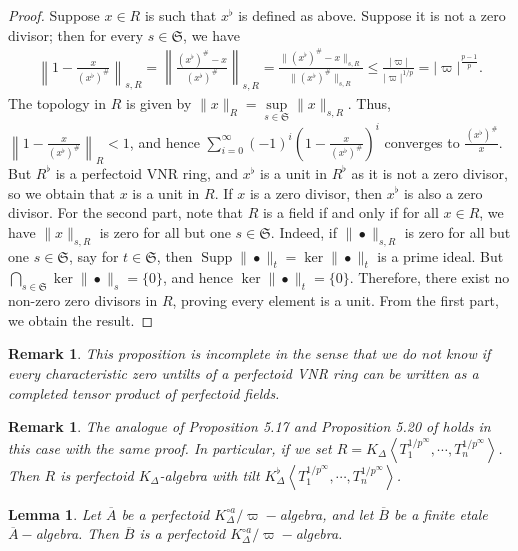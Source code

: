 \documentclass[12pts,a4paper]{amsart}
\newtheorem{lemma}[proposition]{Lemma}
\newtheorem{remark}[proposition]{Remark}
\DeclareMathOperator{\Supp}{Supp}
\begin{document}
\begin{proof}
Suppose $x\in R$ is such that $x^\flat$ is defined as above. Suppose it is not a zero divisor; then for every $s\in\mathfrak{S}$, we have
\begin{align*}
\left\|1-\frac{x}{(x^\flat)^\#}\right\|_{s,R}=\left\|\frac{(x^\flat)^\#-x}{(x^\flat)^\#}\right\|_{s,R}=\frac{\|(x^\flat)^\#-x\|_{s,R}}{\|(x^\flat)^\#\|_{s,R}}\leq \frac{|\varpi|}{|\varpi|^{1/p}}=|\varpi|^{\frac{p-1}{p}}.
\end{align*}
The topology in $R$ is given by $\|x\|_R=\sup\limits_{s\in\mathfrak{S}}\|x\|_{s,R}$. Thus, $\left\|1-\frac{x}{(x^\flat)^\#}\right\|_R<1$, and hence $\sum\limits_{i=0}^\infty (-1)^i\left(1-\frac{x}{(x^\flat)^\#}\right)^i$ converges to $\frac{(x^\flat)^\#}{x}$. But $R^\flat$ is a perfectoid VNR ring, and $x^\flat$ is a unit in $R^\flat$ as it is not a zero divisor, so we obtain that $x$ is a unit in $R$. If $x$ is a zero divisor, then $x^\flat$ is also a zero divisor. For the second part, note that $R$ is a field if and only if for all $x\in R$, we have $\|x\|_{s,R}$ is zero for all but one $s\in\mathfrak{S}$. Indeed, if $\|\bullet\|_{s,R}$ is zero for all but one $s\in\mathfrak{S}$, say for $t\in\mathfrak{S}$, then $\Supp\|\bullet\|_t=\ker\|\bullet\|_t$ is a prime ideal. But $\bigcap\limits_{s\in\mathfrak{S}}\ker\|\bullet\|_s=\{0\}$, and hence $\ker\|\bullet\|_t=\{0\}$. Therefore, there exist no non-zero zero divisors in $R$, proving every element is a unit. From the first part, we obtain the result.
\end{proof}

\begin{remark}
    This proposition is incomplete in the sense that we do not know if every characteristic zero untilts of a perfectoid VNR ring can be written as a completed tensor product of perfectoid fields.
\end{remark}

\begin{remark}
    The analogue of Proposition 5.17 and Proposition 5.20 of \cite{Sch} holds in this case with the same proof. In particular, if we set $R=K_\Delta\left<T^{1/p^\infty}_1,\cdots,T^{1/p^\infty}_n\right>$. Then $R$ is perfectoid $K_\Delta$-algebra with tilt $K^\flat_\Delta\left<T^{1/p^\infty}_1,\cdots,T^{1/p^\infty}_n\right>$.
\end{remark}

\begin{lemma}
    Let $\overline{A}$ be a perfectoid $K^{\circ a}_\Delta/\varpi-$algebra, and let $\overline{B}$ be a finite etale $\overline{A}-$algebra. Then $\overline{B}$ is a perfectoid $K^{\circ a}_\Delta/\varpi-$algebra.
\end{lemma}
\end{document}
